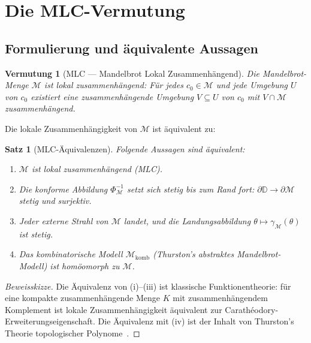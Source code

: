 \documentclass[12pt,a4paper]{amsart}
\newtheorem{satz}[theorem]{Satz}
\newtheorem{vermutung}[theorem]{Vermutung}
\theoremstyle{definition}
\theoremstyle{remark}
\begin{document}
\section{Die MLC-Vermutung}

\subsection{Formulierung und äquivalente Aussagen}

\begin{vermutung}[MLC — Mandelbrot Lokal Zusammenhängend]
\label{verm:MLC}
Die Mandelbrot-Menge $\mathcal{M}$ ist lokal zusammenhängend: Für jedes
$c_0 \in \mathcal{M}$ und jede Umgebung $U$ von $c_0$ existiert eine
zusammenhängende Umgebung $V \subseteq U$ von $c_0$ mit
$V \cap \mathcal{M}$ zusammenhängend.
\end{vermutung}

Die lokale Zusammenhängigkeit von $\mathcal{M}$ ist äquivalent zu:

\begin{satz}[MLC-Äquivalenzen]
Folgende Aussagen sind äquivalent:
\begin{enumerate}[label=\roman*)]
\item $\mathcal{M}$ ist lokal zusammenhängend (MLC).
\item Die konforme Abbildung $\Phi_{\mathcal{M}}^{-1}$ setzt sich stetig
      bis zum Rand fort: $\partial \mathbb{D} \to \partial \mathcal{M}$
      stetig und surjektiv.
\item Jeder externe Strahl von $\mathcal{M}$ landet, und die Landungsabbildung
      $\theta \mapsto \gamma_{\mathcal{M}}(\theta)$ ist stetig.
\item Das kombinatorische Modell $\mathcal{M}_{\mathrm{komb}}$
      (Thurston's abstraktes Mandelbrot-Modell) ist homöomorph zu $\mathcal{M}$.
\end{enumerate}
\end{satz}

\begin{proof}[Beweisskizze]
Die Äquivalenz von (i)--(iii) ist klassische Funktionentheorie:
für eine kompakte zusammenhängende Menge $K$ mit zusammenhängendem
Komplement ist lokale Zusammenhängigkeit äquivalent zur Carathéodory-
Erweiterungseigenschaft. Die Äquivalenz mit (iv) ist der Inhalt von
Thurston's Theorie topologischer Polynome~\cite{Thurston1985}.
\end{proof}
\end{document}
